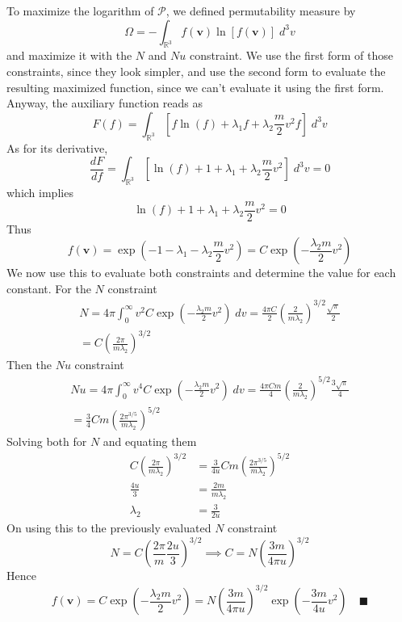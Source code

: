 \documentclass[../../../Main.tex]{subfiles}
\begin{document}
To maximize the logarithm of $\mathcal{P}$, we defined permutability measure by 
\begin{equation*}
    \Omega = - \int_{\mathbb{R}^3}f(\mathbf{v})\ln [f(\mathbf{v})]\;d^3v
\end{equation*}
and maximize it with the $N$ and $Nu$ constraint. We use the first form of those constraints, since they look simpler, and use the second form to evaluate the resulting maximized function, since we can't evaluate it using the first form. Anyway, the auxiliary function reads as
\begin{equation*}
    F(f)=\int_{\mathbb{R}^3} \left[f\ln (f)+\lambda_1f+\lambda_2\frac{m}{2}v^2f\right]\;d^3v
\end{equation*}
As for its derivative,
\begin{equation*}
    \frac{dF}{df}=\int_{\mathbb{R}^3} \left[\ln(f)+1+\lambda_1+\lambda_2\frac{m}{2}v^2\right]\;d^3v=0
\end{equation*}
which implies
\begin{equation*}
    \ln(f)+1+\lambda_1+\lambda_2\frac{m}{2}v^2=0
\end{equation*}
Thus
\begin{equation*}
    f(\mathbf{v})=\exp \left(-1-\lambda_1-\lambda_2\frac{m}{2}v^2\right)=C\exp\left(-\frac{\lambda_2m}{2}v^2\right)
\end{equation*}
We now use this to evaluate both constraints and determine the value for each constant. For the $N$ constraint
\begin{multline*}
    N=4\pi\int_{0}^{\infty}v^2C\exp\left(-\frac{\lambda_2m}{2}v^2\right)\; dv=\frac{4\pi C}{2}\left(\frac{2}{m\lambda_2}\right)^{3/2}\frac{\sqrt{\pi}}{2}\\
    = C\left(\frac{2\pi}{m\lambda_2}\right)^{3/2}
\end{multline*} 
Then the $Nu$ constraint
\begin{multline*}
    Nu=4\pi \int_{0}^{\infty}v^4C\exp\left(-\frac{\lambda_2m}{2}v^2\right)\;dv = \frac{4\pi Cm}{4} \left(\frac{2}{m\lambda_2}\right)^{5/2}\frac{3\sqrt{\pi}}{4}\\
    =\frac{3}{4} Cm\left(\frac{2\pi^{3/5}}{m\lambda_2}\right)^{5/2}
\end{multline*}
Solving both for $N$ and equating them 
\begin{align*}
    C\left(\frac{2\pi}{m\lambda_2}\right)^{3/2} & = \frac{3}{4u} Cm\left(\frac{2\pi^{3/5}}{m\lambda_2}\right)^{5/2}\\
    \frac{4u}{3}&=\frac{2m}{m\lambda_2}\\
    \lambda_2&=\frac{3}{2u}
\end{align*}
On using this to the previously evaluated $N$ constraint
\begin{equation*}
    N=C\left(\frac{2\pi}{m}\frac{2u}{3}\right)^{3/2}\implies C=N \left(\frac{3m}{4\pi u}\right)^{3/2}
\end{equation*}
Hence
\begin{equation*}
    f(\mathbf{v})=C\exp\left(-\frac{\lambda_2m}{2}v^2\right)= N \left(\frac{3m}{4\pi u}\right)^{3/2}\exp\left(-\frac{3m}{4u}v^2\right)\quad\blacksquare
\end{equation*}
\end{document}
